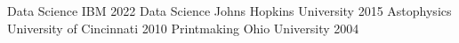 \begin{cvdegrees}
  \cvdegree
    {\ibmDsHonor} %
    {Data Science}
    {IBM} %
    {2022} %
  \cvdegree
    {\jhuDsHonor} %
    {Data Science}
    {Johns Hopkins University} %
    {2015} %
  \cvdegree
    {\ucMsHonor} %
    {Astophysics}
    {University of Cincinnati} %
    {2010} %
\cvdegree
  {\ouBfaHonor} %
  {Printmaking}
  {Ohio University} %
  {2004} %
\end{cvdegrees}
